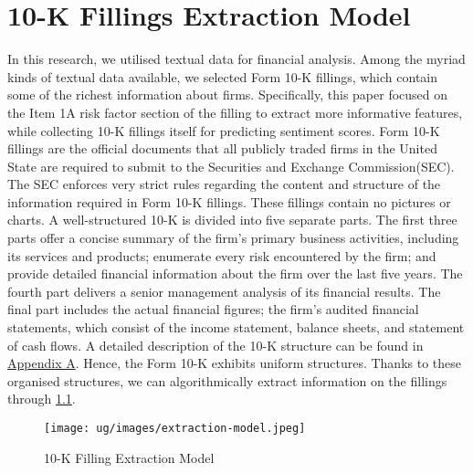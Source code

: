 \documentclass[logo,bsc,singlespacing,parskip]{infthesis}
\begin{document}
\chapter{10-K Fillings Extraction Model}
\label{extraction-model}
In this research, we utilised textual data for financial analysis. Among the myriad kinds of textual data available, we selected Form 10-K fillings, which contain some of the richest information about firms. Specifically, this paper focused on the Item 1A risk factor section of the filling to extract more informative features, while collecting 10-K fillings itself for predicting sentiment scores. Form 10-K fillings are the official documents that all publicly traded firms in the United State are required to submit to the Securities and Exchange Commission(SEC). The SEC enforces very strict rules regarding the content and structure of the information required in Form 10-K fillings. These fillings contain no pictures or charts. A well-structured 10-K is divided into five separate parts. The first three parts offer a concise summary of the firm’s primary business activities, including its services and products; enumerate every risk encountered by the firm; and provide detailed financial information about the firm over the last five years. The fourth part delivers a senior management analysis of its financial results. The final part includes the actual financial figures; the firm’s audited financial statements, which consist of the income statement, balance sheets, and statement of cash flows. A detailed description of the 10-K structure can be found in \hyperref[appendix_10-k]{Appendix A}. Hence, the Form 10-K exhibits uniform structures. Thanks to these organised structures, we can algorithmically extract information on the fillings through \ref{fig:extraction-model}. \cite{Hering2016, Sha2023} 

\begin{figure}[h!]
    \centering
    \texttt{[image: ug/images/extraction-model.jpeg]}
    \caption{10-K Filling Extraction Model}
    \label{fig:extraction-model}
\end{figure}
\end{document}
